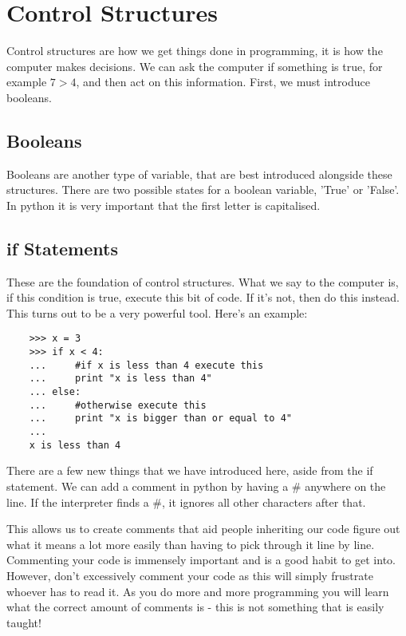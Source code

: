 \section{Control Structures}

Control structures are how we get things done in programming, it is how the
computer makes decisions. We can ask the computer if something is true, for
example $7 > 4$, and then act on this information. First, we must introduce
booleans.

\subsection {Booleans}

Booleans are another type of variable, that are best introduced alongside these
structures. There are two possible states for a boolean variable, 'True' or
'False'. In python it is very important that the first letter is capitalised.

\subsection{if Statements}

These are the foundation of control structures. What we say to the computer is,
if this condition is true, execute this bit of code. If it's not, then do this
instead. This turns out to be a very powerful tool. Here's an example:

\begin{lstlisting}
    >>> x = 3
    >>> if x < 4:
    ...     #if x is less than 4 execute this
    ...     print "x is less than 4"
    ... else:
    ...     #otherwise execute this
    ...     print "x is bigger than or equal to 4"
    ...
    x is less than 4
\end{lstlisting}

There are a few new things that we have introduced here, aside from the if
statement. We can add a comment in python by having a \# anywhere on the line.
If the interpreter finds a \#, it ignores all other characters after that.

This allows us to create comments that aid people inheriting our code figure
out what it means a lot more easily than having to pick through it line by line.
Commenting your code is immensely important and is a good habit to get into.
However, don't excessively comment your code as this will simply frustrate
whoever has to read it. As you do more and more programming you will learn what
the correct amount of comments is - this is not something that is easily taught!

